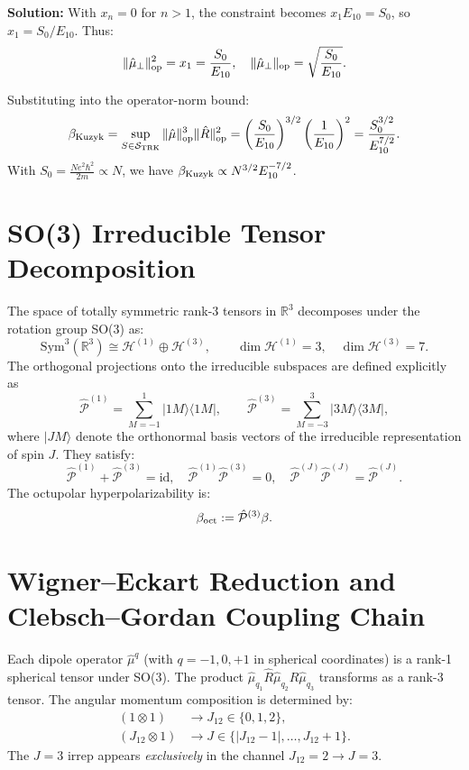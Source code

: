 \documentclass[11pt]{article}
\newcommand{\Proj}[1]{\hat{\mathcal{P}}^{(#1)}}
\begin{document}
\textbf{Solution:} With $x_n = 0$ for $n > 1$, the constraint becomes $x_1 E_{10} = S_0$, so $x_1 = S_0 / E_{10}$. Thus:
\[
\|\hat{\mu}_\perp\|_{\rm op}^2 = x_1 = \frac{S_0}{E_{10}}, \quad \|\hat{\mu}_\perp\|_{\rm op} = \sqrt{\frac{S_0}{E_{10}}}.
\]

Substituting into the operator-norm bound:
\[
\beta_{\rm Kuzyk} = \sup_{S \in \mathcal{S}_{\rm TRK}} \|\hat{\vb{\mu}}\|_{\rm op}^3\|\hat{R}\|_{\rm op}^2 = \left(\frac{S_0}{E_{10}}\right)^{3/2} \left(\frac{1}{E_{10}}\right)^2 = \frac{S_0^{3/2}}{E_{10}^{7/2}}.
\]
With $S_0 = \frac{Ne^2\hbar^2}{2m} \propto N$, we have $\beta_{\rm Kuzyk} \propto N^{3/2} E_{10}^{-7/2}$.

\section{SO(3) Irreducible Tensor Decomposition}

The space of totally symmetric rank-3 tensors in $\mathbb{R}^3$ decomposes under the rotation group SO(3) as:
\[
\mathrm{Sym}^3(\mathbb{R}^3)\cong\mathcal{H}^{(1)}\oplus\mathcal{H}^{(3)},\qquad\dim\mathcal{H}^{(1)}=3,\quad\dim\mathcal{H}^{(3)}=7.
\]
The orthogonal projections onto the irreducible subspaces are defined explicitly as
\[
\Proj{1}=\sum_{M=-1}^1|1M\rangle\langle 1M|, \qquad \Proj{3}=\sum_{M=-3}^3|3M\rangle\langle 3M|,
\]
where $|JM\rangle$ denote the orthonormal basis vectors of the irreducible representation of spin $J$. They satisfy:
\[
\Proj{1}+\Proj{3}=\mathrm{id}, \quad \Proj{1}\Proj{3}=0, \quad \Proj{J}\Proj{J} = \Proj{J}.
\]
The octupolar hyperpolarizability is:
\[
\beta_{\rm oct}:=\Proj{3}\beta.
\]

\section{Wigner--Eckart Reduction and Clebsch--Gordan Coupling Chain}

Each dipole operator $\hat{\mu}^q$ (with $q = -1, 0, +1$ in spherical coordinates) is a rank-1 spherical tensor under SO(3). The product $\hat{\mu}_{q_1} \hat{R} \hat{\mu}_{q_2} \hat{R} \hat{\mu}_{q_3}$ transforms as a rank-3 tensor. The angular momentum composition is determined by:
\begin{align}
(1 \otimes 1) &\to J_{12} \in \{0, 1, 2\}, \\
(J_{12} \otimes 1) &\to J \in \{|J_{12}-1|, \ldots, J_{12}+1\}.
\end{align}
The $J=3$ irrep appears \textit{exclusively} in the channel $J_{12} = 2 \to J = 3$.
\end{document}
